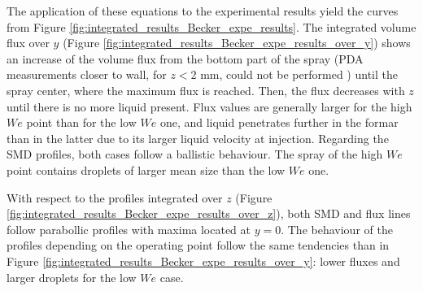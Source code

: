 %

The application of these equations to the experimental results yield the curves from Figure \ref{fig:integrated_results_Becker_expe_results}. The integrated volume flux over $y$ (Figure \ref{fig:integrated_results_Becker_expe_results_over_y}) shows an increase of the volume flux from the bottom part of the spray (PDA measurements closer to wall, for $z < 2$ mm, could not be performed ) until the spray center, where the maximum flux is reached. Then, the flux decreases with $z$ until there is no more liquid present. Flux values are generally larger for the high $We$ point than for the low $We$ one, and liquid penetrates further in the formar than in the latter due to its larger liquid velocity at injection. Regarding the SMD profiles, both cases follow a ballistic behaviour. The spray of the high $We$ point contains droplets of larger mean size than the low $We$ one.

With respect to the profiles integrated over $z$ (Figure \ref{fig:integrated_results_Becker_expe_results_over_z}), both SMD and flux lines follow parabollic profiles with maxima located at $y = 0$. The behaviour of the profiles depending on the operating point follow the same tendencies than in Figure \ref{fig:integrated_results_Becker_expe_results_over_y}: lower fluxes and larger droplets for the low $We$ case.



